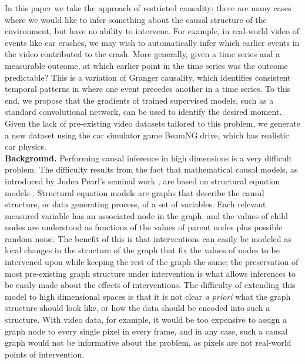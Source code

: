 \documentclass[letterpaper]{article} %
\begin{document}
In this paper we take the approach of restricted causality: there are many cases where we would like to infer something about the causal structure of the environment, but have no ability to intervene. For example, in real-world video of events like car crashes, we may wish to automatically infer which earlier events in the video contributed to the crash. More generally, given a time series and a measurable outcome, at which earlier point in the time series was the outcome predictable? This is a variation of Granger causality, which identifies consistent temporal patterns in where one event precedes another in a time series. To this end, we propose that the gradients of trained supervised models, such as a standard convolutional network, can be used to identify the desired moment. Given the lack of pre-existing video datasets tailored to this problem, we generate a new dataset using the car simulator game BeamNG.drive, which has realistic car physics. \\


\noindent \textbf{Background.} Performing causal inference in high dimensions is a very difficult problem. The difficulty results from the fact that mathematical causal models, as introduced by Judea Pearl's seminal work \cite{pearl2009causalitybook}, are based on structural equation models \cite{duncan2014introduction}. Structural equation models are graphs that describe the causal structure, or data generating process, of a set of variables.  Each relevant measured variable has an associated node in the graph, and the values of child nodes are understood as functions of the values of parent nodes plus possible random noise. The benefit of this is that interventions can easily be modeled as local changes in the structure of the graph that fix the values of nodes to be intervened upon while keeping the rest of the graph the same; the preservation of most pre-existing graph structure under intervention is what allows inferences to be easily made about the effects of interventions. The difficulty of extending this model to high dimensional spaces is that it is not clear \emph{a priori} what the graph structure should look like, or how the data should be encoded into such a structure. With video data, for example, it would be too expensive to assign a graph node to every single pixel in every frame, and in any case, such a causal graph would not be informative about the problem, as pixels are not real-world points of intervention.
\end{document}
